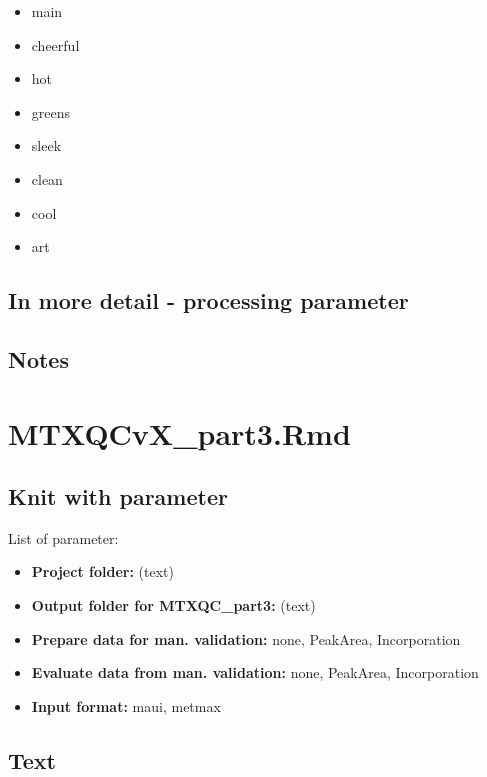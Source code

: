 \documentclass[]{book}
\providecommand{\tightlist}{%
  \setlength{\itemsep}{0pt}\setlength{\parskip}{0pt}}
\theoremstyle{definition}
\theoremstyle{definition}
\theoremstyle{definition}
\theoremstyle{remark}
\begin{document}
\begin{itemize}
  \begin{itemize}
  \tightlist
  \item
    main
  \item
    cheerful
  \item
    hot
  \item
    greens
  \item
    sleek
  \item
    clean
  \item
    cool
  \item
    art
  \end{itemize}
\end{itemize}

\section{In more detail - processing
parameter}\label{in-more-detail---processing-parameter}

\section{Notes}\label{notes}

\chapter{MTXQCvX\_part3.Rmd}\label{part3}

\section{Knit with parameter}\label{knit-with-parameter-4}

List of parameter:

\begin{itemize}
\tightlist
\item
  \textbf{Project folder:} (text)
\item
  \textbf{Output folder for MTXQC\_part3:} (text)
\item
  \textbf{Prepare data for man. validation:} none, PeakArea,
  Incorporation
\item
  \textbf{Evaluate data from man. validation:} none, PeakArea,
  Incorporation
\item
  \textbf{Input format:} maui, metmax
\end{itemize}

\section{Text}\label{text-2}
\end{document}
